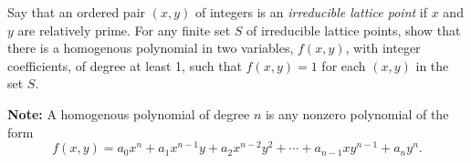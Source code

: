 Say that an ordered pair $(x, y)$ of integers is an \emph{irreducible lattice point} if $x$ and $y$ are relatively prime. For any finite set $S$ of irreducible lattice points, show that there is a homogenous polynomial in two variables, $f(x, y)$, with integer coefficients, of degree at least 1, such that $f(x, y) = 1$ for each $(x, y)$ in the set $S$.

\textbf{Note:} A homogenous polynomial of degree $n$ is any nonzero polynomial of the form
\[
f(x, y) = a_0 x^n + a_1 x^{n-1} y + a_2 x^{n-2} y^2 + \cdots + a_{n-1} x y^{n-1} + a_n y^n.
\]
